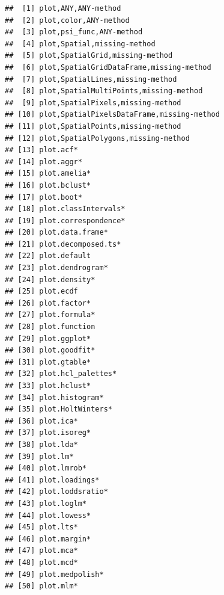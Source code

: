 \documentclass[
]{book}
\theoremstyle{definition}
\theoremstyle{definition}
\theoremstyle{definition}
\theoremstyle{definition}
\theoremstyle{remark}
\begin{document}
\begin{verbatim}
##  [1] plot,ANY,ANY-method                       
##  [2] plot,color,ANY-method                     
##  [3] plot,psi_func,ANY-method                  
##  [4] plot,Spatial,missing-method               
##  [5] plot,SpatialGrid,missing-method           
##  [6] plot,SpatialGridDataFrame,missing-method  
##  [7] plot,SpatialLines,missing-method          
##  [8] plot,SpatialMultiPoints,missing-method    
##  [9] plot,SpatialPixels,missing-method         
## [10] plot,SpatialPixelsDataFrame,missing-method
## [11] plot,SpatialPoints,missing-method         
## [12] plot,SpatialPolygons,missing-method       
## [13] plot.acf*                                 
## [14] plot.aggr*                                
## [15] plot.amelia*                              
## [16] plot.bclust*                              
## [17] plot.boot*                                
## [18] plot.classIntervals*                      
## [19] plot.correspondence*                      
## [20] plot.data.frame*                          
## [21] plot.decomposed.ts*                       
## [22] plot.default                              
## [23] plot.dendrogram*                          
## [24] plot.density*                             
## [25] plot.ecdf                                 
## [26] plot.factor*                              
## [27] plot.formula*                             
## [28] plot.function                             
## [29] plot.ggplot*                              
## [30] plot.goodfit*                             
## [31] plot.gtable*                              
## [32] plot.hcl_palettes*                        
## [33] plot.hclust*                              
## [34] plot.histogram*                           
## [35] plot.HoltWinters*                         
## [36] plot.ica*                                 
## [37] plot.isoreg*                              
## [38] plot.lda*                                 
## [39] plot.lm*                                  
## [40] plot.lmrob*                               
## [41] plot.loadings*                            
## [42] plot.loddsratio*                          
## [43] plot.loglm*                               
## [44] plot.lowess*                              
## [45] plot.lts*                                 
## [46] plot.margin*                              
## [47] plot.mca*                                 
## [48] plot.mcd*                                 
## [49] plot.medpolish*                           
## [50] plot.mlm*                                 

\end{verbatim}
\end{document}
